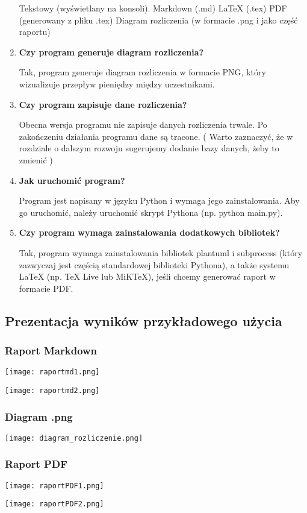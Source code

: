 \documentclass{article}
\begin{document}
\begin{enumerate}
Tekstowy (wyświetlany na konsoli).
Markdown (.md)
LaTeX (.tex)
PDF (generowany z pliku .tex)
Diagram rozliczenia (w formacie .png i jako część raportu)
\item \textbf{Czy program generuje diagram rozliczenia?}

Tak, program generuje diagram rozliczenia w formacie PNG, który wizualizuje przepływ pieniędzy między uczestnikami.

\item \textbf{Czy program zapisuje dane rozliczenia?}

Obecna wersja programu nie zapisuje danych rozliczenia trwale. Po zakończeniu działania programu dane są tracone. ( Warto zaznaczyć, że w rozdziale o dalszym rozwoju sugerujemy dodanie bazy danych, żeby to zmienić )

\item \textbf{Jak uruchomić program?}

Program jest napisany w języku Python i wymaga jego zainstalowania. Aby go uruchomić, należy uruchomić skrypt Pythona (np. python main.py).

\item \textbf{Czy program wymaga zainstalowania dodatkowych bibliotek?}

Tak, program wymaga zainstalowania bibliotek plantuml i subprocess (który zazwyczaj jest częścią standardowej biblioteki Pythona), a także systemu LaTeX (np. TeX Live lub MiKTeX), jeśli chcemy generować raport w formacie PDF.
\end{enumerate}
\subsection{Prezentacja wyników przykładowego użycia}
\subsubsection{Raport Markdown}
\begin{center}
	\texttt{[image: raportmd1.png]}
\end{center}
\begin{center}
	\texttt{[image: raportmd2.png]}
\end{center}
\subsubsection{Diagram .png}
\begin{center}
	\texttt{[image: diagram\_rozliczenie.png]}
\end{center}
\subsubsection{Raport PDF}
\begin{center}
	\texttt{[image: raportPDF1.png]}
\end{center}
\begin{center}
	\texttt{[image: raportPDF2.png]}
\end{center}
	
	
\end{document}
